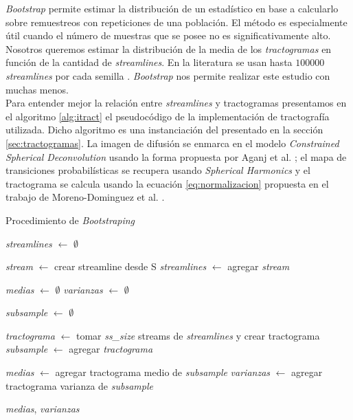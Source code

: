 \vspace{0.3cm}

\textit{Bootstrap} permite estimar la distribuci\'on de un estad\'istico
en base a calcularlo sobre remuestreos con repeticiones de una 
poblaci\'on. El m\'etodo es especialmente \'util cuando el n\'umero de
muestras que se posee no es significativamente alto. Nosotros queremos
estimar la distribuci\'on de la media de los \textit{tractogramas} en 
funci\'on de la cantidad de \textit{streamlines}. En la literatura
se usan hasta $100000$ \textit{streamlines} por cada semilla 
\cite{Anwander2006}. \textit{Bootstrap} nos permite realizar este estudio
con muchas menos. \\

Para entender mejor la relaci\'on entre \textit{streamlines} y
tractogramas presentamos en el algoritmo \ref{alg:itract} el pseudoc\'odigo
de la implementaci\'on de tractograf\'ia utilizada. Dicho algoritmo es una
instanciaci\'on del presentado en la secci\'on \ref{sec:tractogramas}. La
imagen de difusi\'on se enmarca en el modelo \textit{Constrained Spherical
Deconvolution} usando la forma propuesta por Aganj et al. 
\cite{Aganj2010}; el mapa de transiciones probabil\'isticas se recupera
usando \textit{Spherical Harmonics} \cite{Descoteaux2007} y el tractograma
se calcula usando la ecuaci\'on \ref{eq:normalizacion} propuesta en el 
trabajo de Moreno-Dominguez et al. \cite{Moreno-Dominguez2014}. \\

\begin{algorithm}
\caption{Procedimiento de \textit{Bootstraping}}\label{alg:localtracking}
\begin{algorithmic}[1]


\State \emph{streamlines} $\gets$ $\emptyset$

    \State \emph{stream} $\gets$ crear streamline desde S 
    \State \emph{streamlines} $\gets$ agregar \emph{stream}
\EndLoop

\State \emph{medias} $\gets$ $\emptyset$
\State \emph{varianzas} $\gets$ $\emptyset$


    \State \emph{subsample} $\gets$ $\emptyset$

        \State \emph{tractograma} $\gets$ tomar \emph{ss\_size} streams de
                                          \emph{streamlines} y crear
                                          tractograma
        \State \emph{subsample} $\gets$ agregar \emph{tractograma} 
    \EndLoop
    
    \State \emph{medias} $\gets$ agregar tractograma medio de 
                                 \emph{subsample}
    \State \emph{varianzas} $\gets$ agregar tractograma varianza de 
                                    \emph{subsample}
\EndFor

\State \Return \emph{medias}, \emph{varianzas} 
 
\EndProcedure

\end{algorithmic}
\label{alg:bootstrap}
\end{algorithm}

